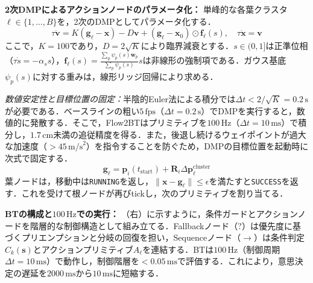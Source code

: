 \documentclass{sice-si}
\begin{document}
\textbf{2次DMPによるアクションノードのパラメータ化：}
単峰的な各葉クラスタ$\ell \in \{1, \dots, B\}$を，2次のDMP\cite{ijspeert2013dynamical}としてパラメータ化する．
\begin{equation}
    \tau \dot{\mathbf{v}} = K (\mathbf{g}_\ell - \mathbf{x}) - D \mathbf{v} + (\mathbf{g}_\ell - \mathbf{x}_0) \odot \mathbf{f}_\ell(s), \quad \tau \dot{\mathbf{x}} = \mathbf{v}
\end{equation}
ここで，$K=100$であり，$D=2\sqrt{K}$により臨界減衰とする．$s \in (0, 1]$は正準位相（$\tau \dot{s} = -\alpha_s s$），$\mathbf{f}_\ell(s) = \frac{\sum_{p} \psi_p(s) \mathbf{w}_p}{\sum_{p} \psi_p(s)} s$は非線形の強制項である．ガウス基底$\psi_p(s)$に対する重みは，線形リッジ回帰により求める．

\textit{数値安定性と目標位置の固定：}半陰的Euler法による積分では$\Delta t < 2/\sqrt{K} = 0.2\,\text{s}$が必要である．ベースラインの粗い$5\,\text{fps}$（$\Delta t = 0.2\,\text{s}$）でDMPを実行すると，数値的に発散する．そこで，Flow2BTはプリミティブを$100\,\text{Hz}$（$\Delta t = 10\,\text{ms}$）で積分し，$1.7\,\text{cm}$未満の追従精度を得る．また，後退し続けるウェイポイントが過大な加速度（$> 45\,\text{m/s}^2$）を指令することを防ぐため，DMPの目標位置を起動時に次式で固定する．
\begin{equation}
    \mathbf{g}_\ell = \mathbf{p}_i(t_{\text{start}}) + \mathbf{R}_i \Delta \mathbf{p}_\ell^{\text{cluster}}
\end{equation}
葉ノードは，移動中は\texttt{RUNNING}を返し，$\|\mathbf{x} - \mathbf{g}_\ell\| \le \epsilon$を満たすと\texttt{SUCCESS}を返す．これを受けて根ノードが再びtickし，次のプリミティブを割り当てる．

\textbf{BTの構成と$100\,\text{Hz}$での実行：}
（右）に示すように，条件ガードとアクションノードを階層的な制御構造として組み立てる．Fallbackノード（$?$）は優先度に基づくプリエンプションと分岐の回復を担い，Sequenceノード（$\to$）は条件判定$C_k(\mathbf{s})$とアクションプリミティブ$A_\ell$を連結する．BTは$100\,\text{Hz}$（制御周期$\Delta t = 10\,\text{ms}$）で動作し，制御階層を$< 0.05\,\text{ms}$で評価する．これにより，意思決定の遅延を$2000\,\text{ms}$から$10\,\text{ms}$に短縮する．
\end{document}
